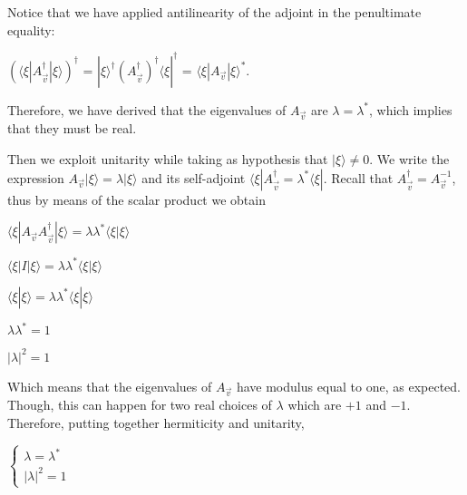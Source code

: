 \documentclass{Configuration_Files/PoliMi3i_thesis}
\begin{document}
Notice that we have applied antilinearity of the adjoint in the penultimate equality: 

\begin{center}
	$(\langle \xi|A_{\vec{v}}^{\dagger}|\xi \rangle)^{\dagger}$ = $|\xi\rangle^{\dagger} (A_{\vec{v}}^{\dagger})^{\dagger} \langle\xi|^{\dagger}$ = $\langle \xi|A_{\vec{v}}|\xi \rangle^*$.  
\end{center}

Therefore, we have derived that the eigenvalues of $A_{\vec{v}}$ are $\lambda = \lambda^*$, which implies that they must be real.


Then we exploit unitarity while taking as hypothesis that $|\xi \rangle \neq 0$. 
We write the expression $A_{\vec{v}} |\xi \rangle = \lambda |\xi \rangle$ and its self-adjoint $\langle \xi| A_{\vec{v}}^{\dagger} = \lambda^* \langle \xi|$. Recall that $A_{\vec{v}}^{\dagger}=A_{\vec{v}}^{-1}$, thus by means of the scalar product we obtain 

\begin{center}
	$\langle \xi|A_{\vec{v}} A_{\vec{v}}^{\dagger}|\xi\rangle = \lambda \lambda^* \langle \xi |\xi \rangle$
	
	$\langle \xi|I|\xi \rangle = \lambda \lambda^* \langle \xi |\xi \rangle$
	
	$\langle \xi|\xi \rangle = \lambda \lambda^* \langle \xi |\xi \rangle $
	
	$ \lambda \lambda^* = 1 $
	
	$ |\lambda|^2 = 1 $
\end{center}

Which means that the eigenvalues of $A_{\vec{v}}$ have modulus equal to one, as expected. Though, this can happen for two real choices of $\lambda$ which are $+1$ and $-1$.
Therefore, putting together hermiticity and unitarity, 

\begin{center}
$\begin{cases}
	 \lambda = \lambda^* \\
	 |\lambda|^2 = 1 
\end{cases}$
\end{center}
\end{document}
